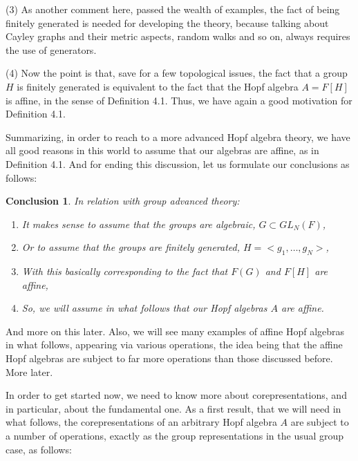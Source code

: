 \documentclass[12pt]{amsbook}
\newtheorem{conclusion}[theorem]{Conclusion}
\begin{document}
(3) As another comment here, passed the wealth of examples, the fact of being finitely generated is needed for developing the theory, because talking about Cayley graphs and their metric aspects, random walks and so on, always requires the use of generators.

\bigskip

(4) Now the point is that, save for a few topological issues, the fact that a group $H$ is finitely generated is equivalent to the fact that the Hopf algebra $A=F[H]$ is affine, in the sense of Definition 4.1. Thus, we have again a good motivation for Definition 4.1.

\bigskip

Summarizing, in order to reach to a more advanced Hopf algebra theory, we have all good reasons in this world to assume that our algebras are affine, as in Definition 4.1. And for ending this discussion, let us formulate our conclusions as follows:

\begin{conclusion}
In relation with group advanced theory:
\begin{enumerate}
\item It makes sense to assume that the groups are algebraic, $G\subset GL_N(F)$,

\item Or to assume that the groups are finitely generated, $H=<g_1,\ldots,g_N>$,

\item With this basically corresponding to the fact that $F(G)$ and $F[H]$ are affine,

\item So, we will assume in what follows that our Hopf algebras $A$ are affine.
\end{enumerate}
\end{conclusion}

And more on this later. Also, we will see many examples of affine Hopf algebras in what follows, appearing via various operations, the idea being that the affine Hopf algebras are subject to far more operations than those discussed before. More later.

\bigskip

In order to get started now, we need to know more about corepresentations, and in particular, about the fundamental one. As a first result, that we will need in what follows, the corepresentations of an arbitrary Hopf algebra $A$ are subject to a number of operations, exactly as the group representations in the usual group case, as follows:
\end{document}
